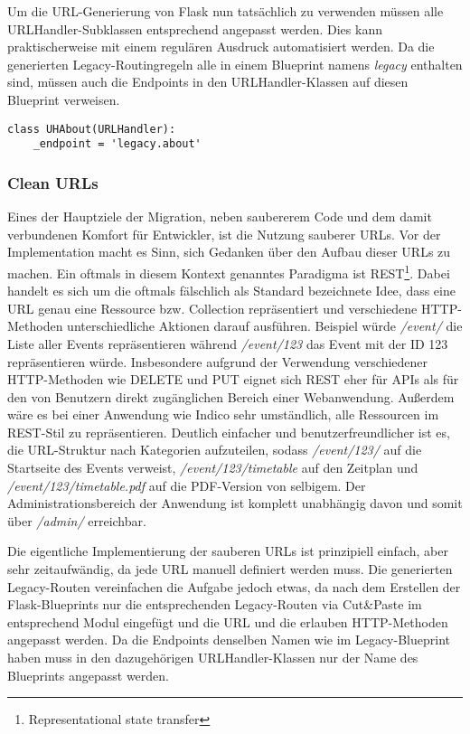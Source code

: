 Um die URL-Generierung von Flask nun tatsächlich zu verwenden müssen alle URLHandler-Subklassen
entsprechend angepasst werden. Dies kann praktischerweise mit einem regulären Ausdruck automatisiert
werden. Da die generierten Legacy-Routingregeln alle in einem Blueprint namens \emph{legacy}
enthalten sind, müssen auch die Endpoints in den URLHandler-Klassen auf diesen Blueprint verweisen.

\begin{lstlisting}[caption=Endpointbasierter URLHandler für about.py]
class UHAbout(URLHandler):
    _endpoint = 'legacy.about'
\end{lstlisting}


\subsubsection{Clean URLs}

Eines der Hauptziele der Migration, neben saubererem Code und dem damit verbundenen Komfort für
Entwickler, ist die Nutzung sauberer URLs. Vor der Implementation macht es Sinn, sich Gedanken über
den Aufbau dieser URLs zu machen. Ein oftmals in diesem Kontext genanntes Paradigma ist
REST\footnote{Representational state transfer}. Dabei handelt es sich um die oftmals fälschlich als
Standard bezeichnete Idee, dass eine URL genau eine Ressource bzw. Collection repräsentiert und
verschiedene HTTP-Methoden unterschiedliche Aktionen darauf ausführen. Beispiel würde \emph{/event/}
die Liste aller Events repräsentieren während \emph{/event/123} das Event mit der ID 123
repräsentieren würde. Insbesondere aufgrund der Verwendung verschiedener HTTP-Methoden wie DELETE
und PUT eignet sich REST eher für APIs als für den von Benutzern direkt zugänglichen Bereich einer
Webanwendung. Außerdem wäre es bei einer Anwendung wie Indico sehr umständlich, alle Ressourcen im
REST-Stil zu repräsentieren. Deutlich einfacher und benutzerfreundlicher ist es, die URL-Struktur
nach Kategorien aufzuteilen, sodass \emph{/event/123/} auf die Startseite des Events verweist,
\emph{/event/123/timetable} auf den Zeitplan und \emph{/event/123/timetable.pdf} auf die PDF-Version
von selbigem. Der Administrationsbereich der Anwendung ist komplett unabhängig davon und somit über
\emph{/admin/} erreichbar.

Die eigentliche Implementierung der sauberen URLs ist prinzipiell einfach, aber sehr zeitaufwändig,
da jede URL manuell definiert werden muss. Die generierten Legacy-Routen vereinfachen die Aufgabe
jedoch etwas, da nach dem Erstellen der Flask-Blueprints nur die entsprechenden Legacy-Routen via
Cut\&Paste im entsprechend Modul eingefügt und die URL und die erlauben HTTP-Methoden angepasst
werden. Da die Endpoints denselben Namen wie im Legacy-Blueprint haben muss in den dazugehörigen
URLHandler-Klassen nur der Name des Blueprints angepasst werden.


